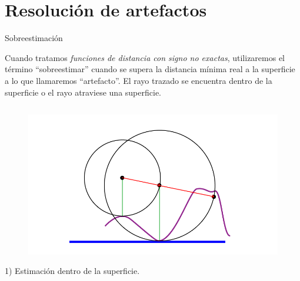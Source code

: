 \section{Resolución de artefactos}

\SectionPage

\begin{frame}{Sobreestimación}
    
    Cuando tratamos \textit{funciones de distancia con signo no exactas}, utilizaremos el término \enquote{sobreestimar} cuando se supera la distancia mínima real a la superficie a lo que llamaremos \enquote{artefacto}.
    El rayo trazado se encuentra dentro de la superficie o  el rayo atraviese una superficie. 
    
    \vfill
    
    \begin{columns}[onlytextwidth]
        \begin{column}{0.45\textwidth}
            \begin{figure}[H]
              \centering
              \includegraphics[width=1.0\textwidth]{imagenes/estimation/sobreestimar-interior.png}
            \end{figure}
            {\small 1) Estimación dentro de la superficie.}
        \end{column}
        

\end{columns}
\end{frame}

